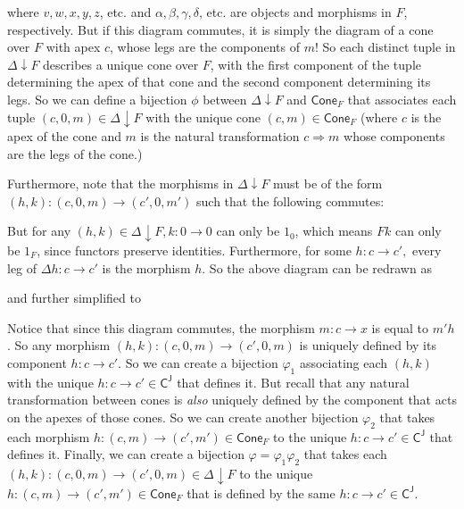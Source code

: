 \documentclass[../../main]{subfiles}
\begin{document}
\noindent where $ v, w, x, y, z $, etc. and $ \alpha, \beta, \gamma, \delta $, etc. are objects and morphisms in $ F $, respectively. But if this diagram commutes, it is simply the diagram of a cone over $ F $ with apex $ c $, whose legs are the components of $ m $! So each distinct tuple in  $ \Delta \downarrow F $ describes a unique cone over $ F $, with the first component of the tuple determining the apex of that cone and the second component determining its legs. So we can define a bijection $ \phi $ between $ \Delta \downarrow F $ and $ \mathsf{Cone}_F $ that associates each tuple $ (c, 0, m) \in \Delta \downarrow F $ with the unique cone $ (c, m) \in \mathsf{Cone}_F $ (where $ c $ is the apex of the cone and $ m $ is the natural transformation $ c \Rightarrow m $ whose components are the legs of the cone.)

Furthermore, note that the morphisms in $ \Delta \downarrow F $ must be of the form $ (h,k) \colon (c, 0, m) \to (c', 0, m') $ such that the following commutes:


But for any $ (h,k) \in \Delta \downarrow F, k \colon 0 \to 0 $ can only be $ 1_0 $, which means $ Fk $ can only be $ 1_F $, since functors preserve identities. Furthermore, for some $ h \colon c \to c',$ every leg of $\Delta h \colon c \to c'$ is the morphism $ h $. So the above diagram can be redrawn as


\noindent and further simplified to



Notice that since this diagram commutes, the morphism $ m \colon c \to x $ is equal to $ m'h $. So any morphism $ (h,k) \colon (c, 0, m) \to (c', 0, m) $ is uniquely defined by its component $ h \colon c \to c' $. So we can create a bijection $ \varphi_1 $ associating each $ (h,k) $ with the unique $ h \colon c \to c' \in \mathsf{C^J} $ that defines it. But recall that any natural transformation between cones is \textit{also} uniquely defined by the component that acts on the apexes of those cones. So we can create another bijection $ \varphi_2 $ that takes each morphism $ h \colon (c, m) \to (c', m') \in \mathsf{Cone}_F $ to the unique $ h \colon c \to c' \in \mathsf{C^J} $ that defines it. Finally, we can create a bijection $ \varphi = \varphi_1 \varphi_2 $ that takes each $ (h,k) \colon (c, 0, m) \to (c', 0, m) \in \Delta \downarrow F $ to the unique $ h \colon (c, m) \to (c', m') \in \mathsf{Cone}_F $ that is defined by the same $ h \colon c \to c' \in \mathsf{C^J} $. 
\end{document}
